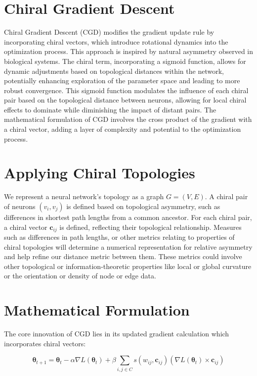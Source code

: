 \documentclass[12pt, a4paper]{article}
\begin{document}
\section{Chiral Gradient Descent}

Chiral Gradient Descent (CGD) modifies the gradient update rule by incorporating chiral vectors, which introduce rotational dynamics into the optimization process. This approach is inspired by natural asymmetry observed in biological systems. The chiral term, incorporating a sigmoid function, allows for dynamic adjustments based on topological distances within the network, potentially enhancing exploration of the parameter space and leading to more robust convergence. This sigmoid function modulates the influence of each chiral pair based on the topological distance between neurons, allowing for local chiral effects to dominate while diminishing the impact of distant pairs. The mathematical formulation of CGD involves the cross product of the gradient with a chiral vector, adding a layer of complexity and potential to the optimization process.


\section{Applying Chiral Topologies}

We represent a neural network's topology as a graph \(G = (V, E)\). A chiral pair of neurons \((v_i, v_j)\) is defined based on topological asymmetry, such as differences in shortest path lengths from a common ancestor. For each chiral pair, a chiral vector \(\mathbf{c}_{ij}\) is defined, reflecting their topological relationship. Measures such as differences in path lengths, or other metrics relating to properties of chiral topologies will determine a numerical representation for relative asymmetry and help refine our distance metric between them. These metrics could involve other topological or information-theoretic properties like local or global curvature or the orientation or density of node or edge data.

\section{Mathematical Formulation}

The core innovation of CGD lies in its updated gradient calculation which incorporates chiral vectors:

\begin{equation} \label{eq:cgd_sigmoid}
\boldsymbol{\theta}_{t+1} = \boldsymbol{\theta}_t - \alpha \nabla L(\boldsymbol{\theta}_t) + \beta \sum_{i,j \in C} s(w_{ij}, \mathbf{c}_{ij}) (\nabla L(\boldsymbol{\theta}_t) \times \mathbf{c}_{ij})
\end{equation}
\end{document}
